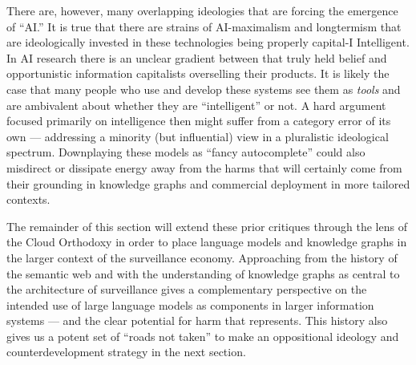 \documentclass{article}
\begin{document}
There are, however, many overlapping ideologies that are forcing the
emergence of ``AI.'' It is true that there are strains of AI-maximalism
and longtermism that are ideologically invested in these technologies being
properly capital-I Intelligent. In AI research there is an unclear
gradient between that truly held belief and opportunistic information
capitalists overselling their products. It is likely
the case that many people who use and develop these systems see them as
\emph{tools} and are ambivalent about whether they are ``intelligent''
or not. A hard argument focused primarily on intelligence then might
suffer from a category error of its own --- addressing a minority (but
influential) view in a pluralistic ideological spectrum. Downplaying
these models as ``fancy autocomplete'' could also misdirect or dissipate
energy away from the harms that will certainly come from their grounding
in knowledge graphs and commercial deployment in more tailored contexts.

The remainder of this section will extend these prior critiques through
the lens of the Cloud Orthodoxy in order to place language models and
knowledge graphs in the larger context of the surveillance economy.
Approaching from the history of the semantic web and with the
understanding of knowledge graphs as central to the architecture of
surveillance gives a complementary perspective on the intended use of
large language models as components in larger information systems ---
and the clear potential for harm that represents. This history also
gives us a potent set of ``roads not taken'' to make an oppositional
ideology and counterdevelopment strategy in the next section.
\end{document}
